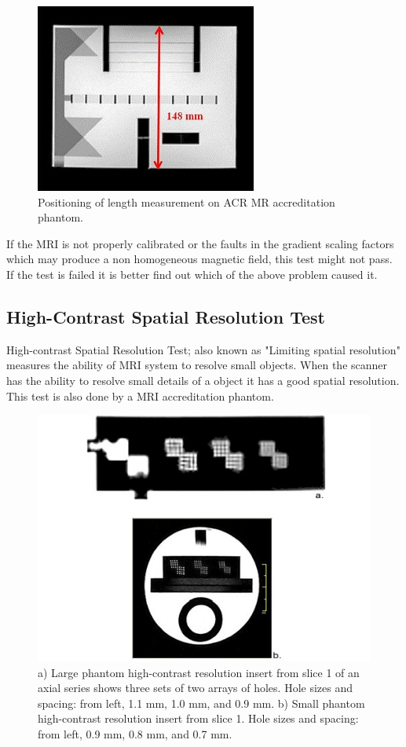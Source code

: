\documentclass[12pt]{article}
\begin{document}
\begin{figure}[h!]
    \centering
    \includegraphics[width=0.5\linewidth]{ph2.jpg}
    \caption{\small{Positioning of length measurement on ACR MR accreditation phantom.}}
    \label{fig:Positioning of length measurement on ACR MR accreditation phantom.}
\end{figure}
If the MRI is not properly calibrated or the faults in the gradient scaling factors which may produce a non homogeneous magnetic field, this test might not pass. If the test is failed it is better find out which of the above problem caused it. 
\subsection{High-Contrast Spatial Resolution Test}
High-contrast Spatial Resolution Test; also known as "Limiting spatial resolution" measures the ability of MRI system to resolve small objects. When the scanner has the ability to resolve small details of a object it has a good spatial resolution. This test is also done by a MRI accreditation phantom. 
\begin{figure}[h!]
    \centering
    \includegraphics[width=0.7\linewidth]{ph3.jpg}
    \caption{\small{a) Large phantom high-contrast resolution insert from slice 1 of an axial series shows three sets of two arrays of holes. Hole sizes and spacing: from left, 1.1 mm, 1.0 mm, and 0.9 mm. b) Small phantom high-contrast resolution insert from slice 1. Hole sizes and spacing: from left, 0.9 mm, 0.8 mm, and 0.7 mm.}}
    \label{fig:a) Large phantom high-contrast resolution insert from slice 1 of an axial series shows three sets of two arrays of holes. Hole sizes and spacing: from left, 1.1 mm, 1.0 mm, and 0.9 mm. b) Small phantom high-contrast resolution insert from slice 1. Hole sizes and spacing: from left, 0.9 mm, 0.8 mm, and 0.7 mm.}
\end{figure}
\end{document}
